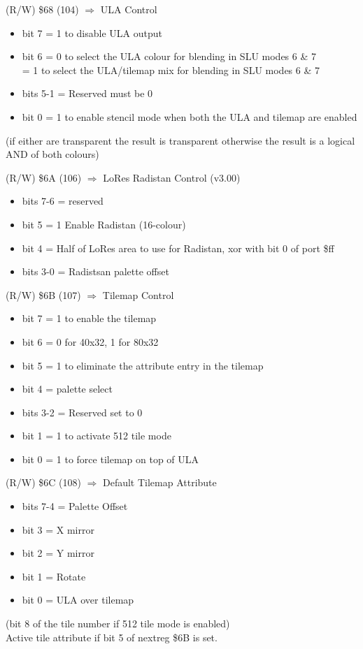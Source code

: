 (R/W) \$68 (104) $\Rightarrow$ ULA Control
\begin{itemize}
\item[] bit 7 = 1 to disable ULA output
\item[] bit 6 = 0 to select the ULA colour for blending in SLU modes 6
  \& 7\\
  = 1 to select the ULA/tilemap mix for blending in SLU modes 6 \& 7
\item[] bits 5-1 = Reserved must be 0
\item[] bit 0 = 1 to enable stencil mode when both the ULA and tilemap
  are enabled
\end{itemize}
(if either are transparent the result is transparent otherwise the
result is a logical AND of both colours)

(R/W) \$6A (106) $\Rightarrow$ LoRes Radistan Control (v3.00)
\begin{itemize}
\item[] bits 7-6 = reserved
\item[] bit 5 = 1 Enable Radistan (16-colour)
\item[] bit 4 = Half of LoRes area to use for Radistan, xor with bit 0
  of port \$ff
\item bits 3-0 = Radistsan palette offset
\end{itemize}

(R/W) \$6B (107) $\Rightarrow$ Tilemap Control
\begin{itemize}
\item[] bit 7 = 1 to enable the tilemap
\item[] bit 6 = 0 for 40x32, 1 for 80x32
\item[] bit 5 = 1 to eliminate the attribute entry in the tilemap
\item[] bit 4 = palette select
\item[] bits 3-2 = Reserved set to 0
\item[] bit 1 = 1 to activate 512 tile mode
\item[] bit 0 = 1 to force tilemap on top of ULA
\end{itemize}

(R/W) \$6C (108) $\Rightarrow$ Default Tilemap Attribute
\begin{itemize}
\item[] bits 7-4 = Palette Offset
\item[] bit 3 = X mirror
\item[] bit 2 = Y mirror
\item[] bit 1 = Rotate
\item[] bit 0 = ULA over tilemap
\end{itemize}
(bit 8 of the tile number if 512 tile mode is enabled)\\
Active tile attribute if bit 5 of nextreg \$6B is set.

